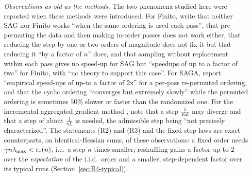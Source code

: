 \emph{Observations as old as the methods.} The two phenomena studied here were reported when these methods were introduced. For Finito, \cite[Section~3]{defazio2014finito} write that neither SAG nor Finito works ``when the same ordering is used each pass'', that pre-permuting the data and then making in-order passes does not work either, that reducing the step by one or two orders of magnitude does not fix it but that reducing it ``by a factor of $n$'' does, and that sampling without replacement within each pass gives no speed-up for SAG but ``speedups of up to a factor of two'' for Finito, with ``no theory to support this case''. For SAGA, \cite[Section~3]{defazio2014saga} report ``empirical speed-ups of up-to a factor of 2x'' for a per-pass re-permuted ordering, and \cite[Section~5.2]{defazio2014new} that the cyclic ordering ``converges but extremely slowly'' while the permuted ordering is sometimes $50\%$ slower or faster than the randomized one. For the incremental aggregated gradient method \cite{blatt2007convergent}, \cite{schmidt2017minimizing} note that a step $\frac1{16L}$ may diverge and that a step of about $\frac1{nL}$ is needed, the admissible step being ``not precisely characterized''. The statements (R2) and (R3) and the fixed-step laws are exact counterparts, on identical-Hessian sums, of these observations: a fixed order needs $\gamma n\lambda_{\max}<c_\ast(n)$, i.e.\ a step $n$ times smaller; reshuffling gains a factor up to $2$ over the \emph{expectation} of the i.i.d.\ order and a smaller, step-dependent factor over its typical runs (Section~\ref{sec:B4-typical}).

